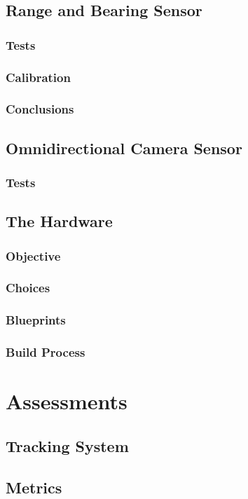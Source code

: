 \documentclass[a4paper, 12pt]{report}
\begin{document}
	\section{Range and Bearing Sensor}
		\subsection{Tests}
		\subsection{Calibration}
		\subsection{Conclusions}

	\section{Omnidirectional Camera Sensor}
		\subsection{Tests}

	\section{The Hardware}
		\subsection{Objective}
		\subsection{Choices}
		\subsection{Blueprints}
		\subsection{Build Process}

\chapter{Assessments}
	\section{Tracking System}
	\section{Metrics}
\end{document}
